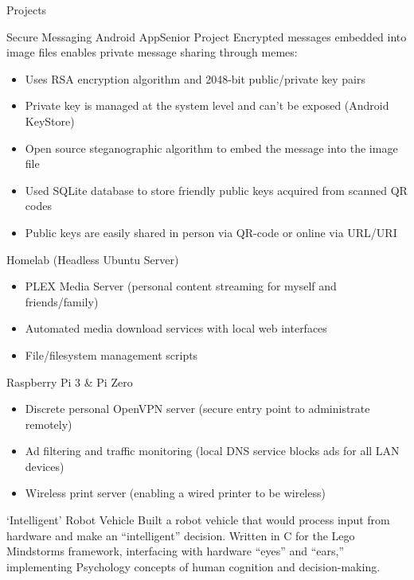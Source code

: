 \documentclass[]{mcdowellcv}
\begin{document}
	\begin{cvsection}{Projects}
		\begin{cvsubsection}{Secure Messaging Android App}{Senior Project}
			Encrypted messages embedded into image files enables private message sharing through memes: 
			\begin{itemize}[topsep=-3pt]
				\item Uses RSA encryption algorithm and 2048-bit public/private key pairs
				\item Private key is managed at the system level and can't be exposed (Android KeyStore)
				\item Open source steganographic algorithm to embed the message into the image file
				\item Used SQLite database to store friendly public keys acquired from scanned QR codes
				\item Public keys are easily shared in person via QR-code or online via URL/URI
			\end{itemize}
		\end{cvsubsection}
		
		\begin{cvsubsection}{Homelab (Headless Ubuntu Server)}{}
			\begin{itemize}
				\item PLEX Media Server (personal content streaming for myself and friends/family)
				\item Automated media download services with local web interfaces
				\item File/filesystem management scripts
			\end{itemize}
		\end{cvsubsection}
		\begin{cvsubsection}{Raspberry Pi 3 \& Pi Zero}{}
			\begin{itemize}
				\item Discrete personal OpenVPN server (secure entry point to administrate remotely)
				\item Ad filtering and traffic monitoring (local DNS service blocks ads for all LAN devices)
				\item Wireless print server (enabling a wired printer to be wireless)
			\end{itemize}
		\end{cvsubsection}
		
		\begin{cvsubsection}{‘Intelligent’ Robot Vehicle}{}
			Built a robot vehicle that would process input from hardware and make an “intelligent” decision. \newline  
			Written in C for the Lego Mindstorms framework, interfacing with hardware “eyes” and “ears,” \newline 
			implementing Psychology concepts of human cognition and decision-making. 
		\end{cvsubsection}
	\end{cvsection}
	
\end{document}
